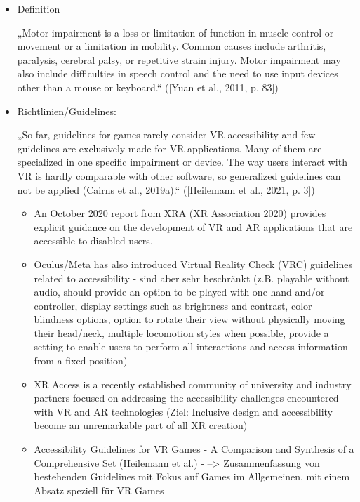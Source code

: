 \begin{itemize}
    \item Definition
    
    „Motor impairment is a loss or limitation of function in muscle control or movement or a limitation in mobility. Common causes include arthritis, paralysis, cerebral palsy, or repetitive strain injury. Motor impairment may also include difficulties in speech control and the need to use input devices other than a mouse or keyboard.“ ([Yuan et al., 2011, p. 83])
    
    \item Richtlinien/Guidelines: 
    
    „So far, guidelines for games rarely consider VR accessibility and few guidelines are exclusively made for VR applications. Many of them are specialized in one specific impairment or device. The way users interact with VR is hardly comparable with other software, so generalized guidelines can not be applied (Cairns et al., 2019a).“ ([Heilemann et al., 2021, p. 3])
    
    \begin{itemize}
        \item An October 2020 report from XRA (XR Association 2020) provides explicit guidance on the development of VR and AR applications that are accessible to disabled users.
        \item Oculus/Meta has also introduced Virtual Reality Check (VRC) guidelines related to accessibility - sind aber sehr beschränkt (z.B. playable without audio, should provide an option to be played with one hand and/or controller, display settings such as brightness and contrast, color blindness options, option to rotate their view without physically moving their head/neck, multiple locomotion styles when possible, provide a setting to enable users to perform all interactions and access information from a fixed position)  
        \item XR Access is a recently established community of university and industry partners focused on addressing the accessibility challenges encountered with VR and AR technologies (Ziel: Inclusive design and accessibility become an unremarkable part of all XR creation) 
        \item Accessibility Guidelines for VR Games - A Comparison and Synthesis of a Comprehensive Set (Heilemann et al.) - --> Zusammenfassung von bestehenden Guidelines mit Fokus auf Games im Allgemeinen, mit einem Absatz speziell für VR Games
    \end{itemize}
\end{itemize}

